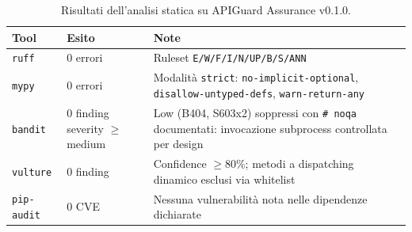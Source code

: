 \begin{table}[htb]
  \centering
  \small
  \begin{tabularx}{\textwidth}{@{} l l >{\raggedright\arraybackslash}X @{}}
    \toprule
    \textbf{Tool}      & \textbf{Esito}                   & \textbf{Note}                                          \\
    \midrule
    \texttt{ruff}      & 0 errori                         &
    Ruleset \texttt{E/W/F/I/N/UP/B/S/ANN}                                                                          \\
    \addlinespace
    \texttt{mypy}      & 0 errori                         &
    Modalità \texttt{strict}: \texttt{no-implicit-optional},
    \texttt{disallow-untyped-defs}, \texttt{warn-return-any}                                                       \\
    \addlinespace
    \texttt{bandit}    & 0 finding severity $\geq$ medium &
    3 Low (B404, S603x2) soppressi con \texttt{\# noqa} documentati: invocazione subprocess controllata per design \\
    \addlinespace
    \texttt{vulture}   & 0 finding                        &
    Confidence $\ge$80\%; metodi a dispatching dinamico esclusi via whitelist                                      \\
    \addlinespace
    \texttt{pip-audit} & 0 \gls{CVE}                      &
    Nessuna vulnerabilità nota nelle dipendenze dichiarate                                                         \\
    \bottomrule
  \end{tabularx}
  \caption{Risultati dell'analisi statica su APIGuard Assurance v0.1.0.}
  \label{tab:analisi-statica}
\end{table}